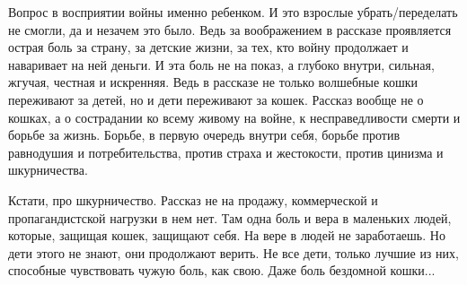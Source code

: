 Вопрос в восприятии войны именно ребенком. И это взрослые убрать/переделать не
смогли, да и незачем это было. Ведь за воображением в рассказе проявляется
острая боль за страну, за детские жизни, за тех, кто войну продолжает и
наваривает на ней деньги. И эта боль не на показ, а глубоко внутри, сильная,
жгучая, честная и искренняя. Ведь в рассказе не только волшебные кошки
переживают за детей, но и дети переживают за кошек. Рассказ вообще не о кошках,
а о сострадании ко всему живому на войне, к несправедливости смерти и борьбе за
жизнь. Борьбе, в первую очередь внутри себя, борьбе против равнодушия и
потребительства, против страха и жестокости, против цинизма и шкурничества. 

Кстати, про шкурничество. Рассказ не на продажу, коммерческой и
пропагандистской нагрузки в нем нет. Там одна боль и вера в маленьких людей,
которые, защищая кошек,  защищают себя. На вере в людей не заработаешь. Но дети
этого не знают, они продолжают верить. Не все дети, только лучшие из них,
способные чувствовать чужую боль, как свою. Даже боль бездомной кошки...
